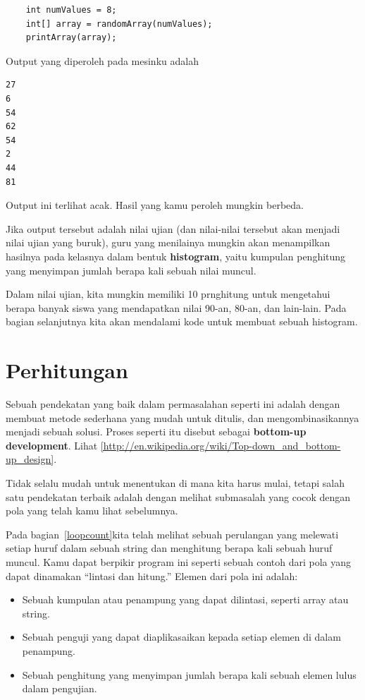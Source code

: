 \begin{lstlisting}
    int numValues = 8;
    int[] array = randomArray(numValues);
    printArray(array);
\end{lstlisting}
%
Output yang diperoleh pada mesinku adalah

\begin{verbatim}
27
6
54
62
54
2
44
81
\end{verbatim}
%
Output ini terlihat acak. Hasil yang kamu peroleh mungkin berbeda.

Jika output tersebut adalah nilai ujian (dan nilai-nilai tersebut akan menjadi nilai ujian yang buruk), guru yang menilainya mungkin akan menampilkan hasilnya pada kelasnya dalam bentuk {\bf histogram}, yaitu kumpulan penghitung yang menyimpan jumlah berapa kali sebuah nilai muncul.


Dalam nilai ujian, kita mungkin memiliki 10 prnghitung untuk mengetahui berapa banyak siswa yang mendapatkan nilai 90-an, 80-an, dan lain-lain. Pada bagian selanjutnya kita akan mendalami kode untuk membuat sebuah histogram.


\section{Perhitungan}

Sebuah pendekatan yang baik dalam permasalahan seperti ini adalah dengan membuat metode sederhana yang mudah untuk ditulis, dan mengombinasikannya menjadi sebuah solusi.
Proses seperti itu disebut sebagai {\bf bottom-up development}.
Lihat \ref{http://en.wikipedia.org/wiki/Top-down_and_bottom-up_design}.

Tidak selalu mudah untuk menentukan di mana kita harus mulai, tetapi salah satu pendekatan terbaik adalah dengan melihat submasalah yang cocok dengan pola yang telah kamu lihat sebelumnya.

Pada bagian~\ref{loopcount}kita telah melihat sebuah perulangan yang melewati setiap huruf dalam sebuah string dan menghitung berapa kali sebuah huruf muncul. Kamu dapat berpikir program ini seperti sebuah contoh dari pola yang dapat dinamakan ``lintasi dan hitung.''  Elemen dari pola ini adalah:

\begin{itemize}

\item Sebuah kumpulan atau penampung yang dapat dilintasi, seperti array atau string.

\item Sebuah penguji yang dapat diaplikasaikan kepada setiap elemen di dalam penampung.

\item Sebuah penghitung yang menyimpan jumlah berapa kali sebuah elemen lulus dalam pengujian.

\end{itemize}


